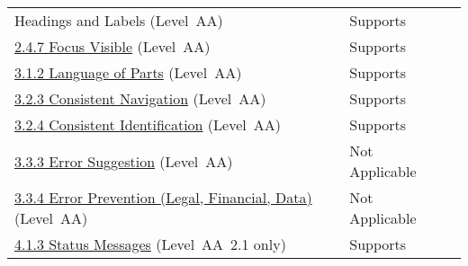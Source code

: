\documentclass{report}
\begin{document}
\begin{longtable}{p{}<{\RaggedRight}p{}<{\RaggedRight}p{}<{\RaggedRight}}
{  Headings and Labels} (Level~AA) & Supports\\
  \href{http://www.w3.org/TR/WCAG20/#navigation-mechanisms-focus-visible}{2.4.7
  Focus Visible} (Level~AA) & Supports\\
  \href{http://www.w3.org/TR/WCAG20/#meaning-other-lang-id}{3.1.2
  Language of Parts} (Level~AA) & Supports\\
  \href{http://www.w3.org/TR/WCAG20/#consistent-behavior-consistent-locations}{3.2.3
  Consistent Navigation} (Level~AA) & Supports\\
  \href{http://www.w3.org/TR/WCAG20/#consistent-behavior-consistent-functionality}{3.2.4
  Consistent Identification} (Level~AA) & Supports\\
  \href{http://www.w3.org/TR/WCAG20/#minimize-error-suggestions}{3.3.3
  Error Suggestion} (Level~AA) & Not Applicable\\
  \href{http://www.w3.org/TR/WCAG20/#minimize-error-reversible}{3.3.4
  Error Prevention (Legal, Financial, Data)} (Level~AA) & Not
                                                          Applicable\\
  \href{https://www.w3.org/TR/WCAG21/#status-messages}{4.1.3 Status
  Messages} (Level~AA~2.1 only) & Supports\\
\end{longtable}
\end{document}
